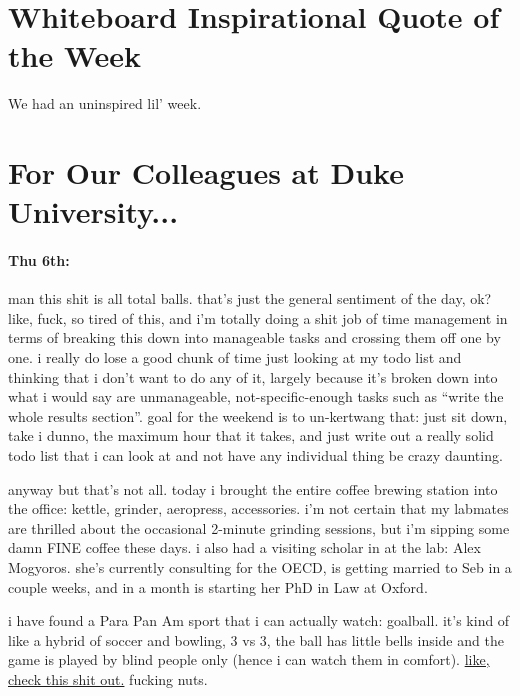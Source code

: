 \documentclass[12pt]{article}
\begin{document}
\newpage
\section*{Whiteboard Inspirational Quote of the Week}
We had an uninspired lil' week.

\section*{For Our Colleagues at Duke University...}
\paragraph{Thu 6th:} man this shit is all total balls. that's just the general sentiment of the day, ok? like, fuck, so tired of this, and i'm totally doing a shit job of time management in terms of breaking this down into manageable tasks and crossing them off one by one. i really do lose a good chunk of time just looking at my todo list and thinking that i don't want to do any of it, largely because it's broken down into what i would say are unmanageable, not-specific-enough tasks such as ``write the whole results section''. goal for the weekend is to un-kertwang that: just sit down, take i dunno, the maximum hour that it takes, and just write out a really solid todo list that i can look at and not have any individual thing be crazy daunting. \par
anyway but that's not all. today i brought the entire coffee brewing station into the office: kettle, grinder, aeropress, accessories. i'm not certain that my labmates are thrilled about the occasional 2-minute grinding sessions, but i'm sipping some damn FINE coffee these days. i also had a visiting scholar in at the lab: Alex Mogyoros. she's currently consulting for the OECD, is getting married to Seb in a couple weeks, and in a month is starting her PhD in Law at Oxford.\par
i have found a Para Pan Am sport that i can actually watch: goalball. it's kind of like a hybrid of soccer and bowling, 3 vs 3, the ball has little bells inside and the game is played by blind people only (hence i can watch them in comfort). \href{https://youtu.be/Zj6galPLxmQ}{like, check this shit out.} fucking nuts.
\end{document}

